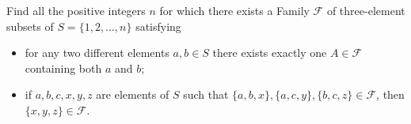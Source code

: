 Find all the positive integers \(n\) for  which there exists a Family \(\mathcal{F}\) of three-element subsets of \(S=\{1,2,\dots,n\}\) satisfying
\begin{itemize}
    \item[(i)] for any two different  elements \(a,b \in S\) there exists exactly one \(A \in \mathcal{F}\) containing both \(a\) and \(b\);
    \item[(ii)] if \(a,b,c,x,y,z\) are elements of \(S\) such that \(\{a,b,x\},\{a,c,y\},\{b,c,z\} \in \mathcal{F}\), then \(\{x,y,z\} \in \mathcal{F} \).
\end{itemize}